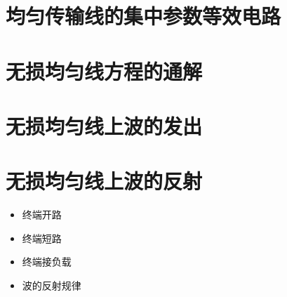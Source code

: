 \section{均匀传输线的集中参数等效电路}

\section{无损均匀线方程的通解}

\section{无损均匀线上波的发出}

\section{无损均匀线上波的反射}
\begin{itemize}
    \item 终端开路
    \item 终端短路
    \item 终端接负载
    \item 波的反射规律
\end{itemize}